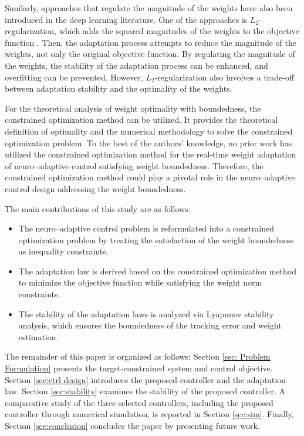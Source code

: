 \documentclass[letterpaper, 10 pt, conference]{ieeeconf}  %
\begin{document}
Similarly, approaches that regulate the magnitude of the weights have also been introduced in the deep learning literature.
One of the approaches is $L_2$-regularization, which adds the squared magnitudes of the weights to the objective function \cite{Wu:2020aa,Lewkowycz:2020aa}.
Then, the adaptation process attempts to reduce the magnitude of the weights, not only the original objective function.
By regulating the magnitude of the weights, the stability of the adaptation process can be enhanced, and overfitting can be prevented.
However, $L_2$-regularization also involves a trade-off between adaptation stability and the optimality of the weights.

For the theoretical analysis of weight optimality with boundedness, the constrained optimization method \cite{Nocedal:2006aa} can be utilized.
It provides the theoretical definition of optimality and the numerical methodology to solve the constrained optimization problem.
To the best of the authors’ knowledge, no prior work has utilized the constrained optimization method for the real-time weight adaptation of neuro–adaptive control satisfying weight boundedness.
Therefore, the constrained optimization method could play a pivotal role in the neuro–adaptive control design addressing the weight boundedness.

The main contributions of this study are as follows:
\begin{itemize}
    \item The neuro–adaptive control problem is reformulated into a constrained optimization problem by treating the satisfaction of the weight boundedness as inequality constraints.
    \item The adaptation law is derived based on the constrained optimization method to minimize the objective function while satisfying the weight norm constraints.
    \item The stability of the adaptation laws is analyzed via Lyapunov stability analysis, which ensures the boundedness of the tracking error and weight estimation.
\end{itemize}

The remainder of this paper is organized as follows:
Section \ref{sec: Problem Formulation} presents the target-constrained system and control objective.
Section \ref{sec:ctrl design} introduces the proposed controller and the adaptation law. 
Section \ref{sec:stability} examines the stability of the proposed controller.
A comparative study of the three selected controllers, including the proposed controller through numerical simulation, is reported in Section \ref{sec:sim}.
Finally, Section \ref{sec:conclusion} concludes the paper by presenting future work.
\end{document}
